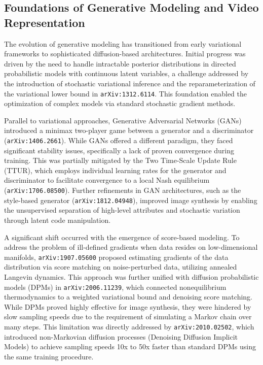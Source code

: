 \documentclass[11pt]{article}
\begin{document}
\subsection{Foundations of Generative Modeling and Video Representation}

The evolution of generative modeling has transitioned from early variational frameworks to sophisticated diffusion-based architectures. Initial progress was driven by the need to handle intractable posterior distributions in directed probabilistic models with continuous latent variables, a challenge addressed by the introduction of stochastic variational inference and the reparameterization of the variational lower bound in \texttt{arXiv:1312.6114}. This foundation enabled the optimization of complex models via standard stochastic gradient methods.

Parallel to variational approaches, Generative Adversarial Networks (GANs) introduced a minimax two-player game between a generator and a discriminator (\texttt{arXiv:1406.2661}). While GANs offered a different paradigm, they faced significant stability issues, specifically a lack of proven convergence during training. This was partially mitigated by the Two Time-Scale Update Rule (TTUR), which employs individual learning rates for the generator and discriminator to facilitate convergence to a local Nash equilibrium (\texttt{arXiv:1706.08500}). Further refinements in GAN architectures, such as the style-based generator (\texttt{arXiv:1812.04948}), improved image synthesis by enabling the unsupervised separation of high-level attributes and stochastic variation through latent code manipulation.

A significant shift occurred with the emergence of score-based modeling. To address the problem of ill-defined gradients when data resides on low-dimensional manifolds, \texttt{arXiv:1907.05600} proposed estimating gradients of the data distribution via score matching on noise-perturbed data, utilizing annealed Langevin dynamics. This approach was further unified with diffusion probabilistic models (DPMs) in \texttt{arXiv:2006.11239}, which connected nonequilibrium thermodynamics to a weighted variational bound and denoising score matching. While DPMs proved highly effective for image synthesis, they were hindered by slow sampling speeds due to the requirement of simulating a Markov chain over many steps. This limitation was directly addressed by \texttt{arXiv:2010.02502}, which introduced non-Markovian diffusion processes (Denoising Diffusion Implicit Models) to achieve sampling speeds 10x to 50x faster than standard DPMs using the same training procedure.
\end{document}
